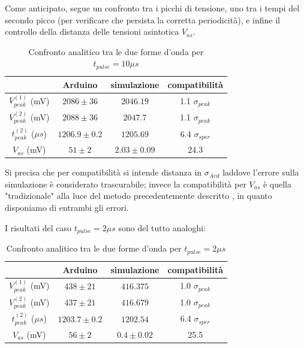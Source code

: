 \documentclass{article}
\begin{document}
Come anticipato, segue un confronto tra i picchi di tensione, uno tra i tempi del secondo picco (per verificare che persista la corretta periodicità),
e infine il controllo della distanza delle tensioni asintotica $V_{as}$. 

\begin{table}[H]
    \centering
    \begin{tabular}{cccc}
        \toprule
                        & Arduino & simulazione & compatibilità \\
        \midrule
        $V_{peak}^{(1)}$ (mV)&   $2086 \pm 36$ & $2046.19$ & 1.1 $\sigma_{peak}$\\
        $V_{peak}^{(2)}$ (mV)&   $2088 \pm 36$ & $2047.7$ & 1.1 $\sigma_{peak}$\\
        $t_{peak}^{(2)}$ ($\mu s$)&   $1206.9 \pm 0.2$ & $1205.69$ & 6.4 $\sigma_{sper}$\\
        $V_{as}$       (mV)&   $51 \pm 2$ & $2.03 \pm 0.09$ & 24.3 \\
        \bottomrule
    \end{tabular}
    \caption{Confronto analitico tra le due forme d'onda per $t_{pulse}=10 \mu s$}
\end{table}

Si  precisa che per compatibilità si intende distanza in $\sigma_{Ard}$ laddove l'errore sulla simulazione è considerato trascurabile; invece 
la compatibilità per $V_{as}$ è quella "tradizionale" alla luce del metodo
precedentemente descritto , in quanto disponiamo di entrambi gli errori.

I risultati del caso $t_{pulse}=2 \mu s$ sono del tutto analoghi:

\begin{table}[H]
    \centering
    \begin{tabular}{cccc}
        \toprule
                        & Arduino & simulazione & compatibilità \\
        \midrule
        $V_{peak}^{(1)}$ (mV)&   $438 \pm 21$ & $416.375$ & 1.0 $\sigma_{peak}$\\
        $V_{peak}^{(2)}$ (mV)&   $437 \pm 21$ & $416.679$ & 1.0 $\sigma_{peak}$\\
        $t_{peak}^{(2)}$ ($\mu s$)&   $1203.7 \pm 0.2$ & $1202.54$ & 6.4 $\sigma_{sper}$\\
        $V_{as}$       (mV)&   $56 \pm 2$ & $0.4 \pm 0.02$ & 25.5 \\
        \bottomrule
    \end{tabular}
    \caption{Confronto analitico tra le due forme d'onda per $t_{pulse}=2 \mu s$}
\end{table}
\end{document}
